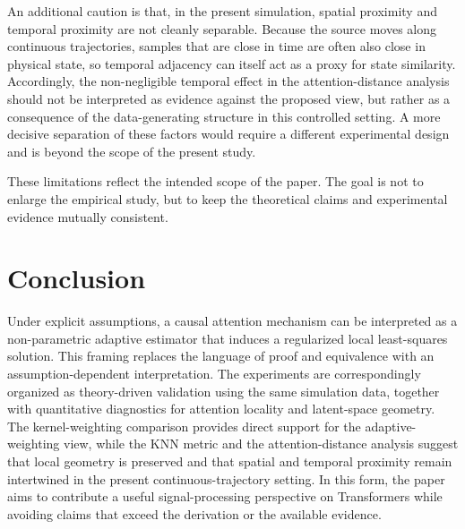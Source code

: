 \documentclass[conference]{IEEEtran}
\begin{document}
An additional caution is that, in the present simulation, spatial proximity and temporal proximity are not cleanly separable. Because the source moves along continuous trajectories, samples that are close in time are often also close in physical state, so temporal adjacency can itself act as a proxy for state similarity. Accordingly, the non-negligible temporal effect in the attention-distance analysis should not be interpreted as evidence against the proposed view, but rather as a consequence of the data-generating structure in this controlled setting. A more decisive separation of these factors would require a different experimental design and is beyond the scope of the present study.

These limitations reflect the intended scope of the paper. The goal is not to enlarge the empirical study, but to keep the theoretical claims and experimental evidence mutually consistent.

\section{Conclusion}
\label{sec:conclusion}
Under explicit assumptions, a causal attention mechanism can be interpreted as a non-parametric adaptive estimator that induces a regularized local least-squares solution. This framing replaces the language of proof and equivalence with an assumption-dependent interpretation. The experiments are correspondingly organized as theory-driven validation using the same simulation data, together with quantitative diagnostics for attention locality and latent-space geometry. The kernel-weighting comparison provides direct support for the adaptive-weighting view, while the KNN metric and the attention-distance analysis suggest that local geometry is preserved and that spatial and temporal proximity remain intertwined in the present continuous-trajectory setting. In this form, the paper aims to contribute a useful signal-processing perspective on Transformers while avoiding claims that exceed the derivation or the available evidence.



\end{document}
